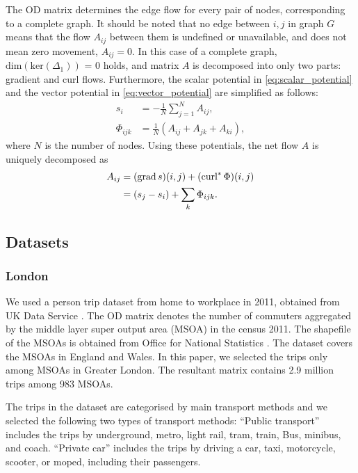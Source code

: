 \documentclass[]{article}
\begin{document}
The OD matrix determines the edge flow for every pair of nodes, corresponding to a complete graph.
It should be noted that no edge between ${i,j}$ in graph $G$ means that the flow $A_{ij}$ between them is undefined or unavailable, and does not mean zero movement, $A_{ij} = 0$.
In this case of a complete graph,
$\text{dim}(\text{ker} (\Delta_1) )$ = 0 holds, and matrix $A$ is decomposed into only two parts: gradient and curl flows.
Furthermore, the scalar potential in \eqref{eq:scalar_potential} and the vector potential in \eqref{eq:vector_potential} are simplified as follows:
\begin{align}
  s_i &= -\frac{1}{N}\sum_{j=1}^N A_{ij},\\
  \Phi_{ijk} & = \frac{1}{N}(A_{ij} + A_{jk} + A_{ki}),
\end{align}
where $N$ is the number of nodes. Using these potentials,
the net flow $A$ is uniquely decomposed as
\begin{align}
  A_{ij} & = (\text{grad}\, s)(i, j)  +  (\text{curl}^*\, \Phi)(i, j) \notag \\
         &= (s_j - s_i) + \sum_k \Phi_{ijk}.
\end{align}


%
%
%
%
%
%
%
%
%
%
%
%
%
%
%
\subsection*{Datasets}
\subsubsection*{London} 
We used a person trip dataset from home to workplace in 2011,
obtained from UK Data Service \cite{TripDataLondon}.
The OD matrix denotes the number of commuters aggregated by the middle layer super output area (MSOA) in the census 2011.
The shapefile of the MSOAs is obtained from Office for National Statistics \cite{ShapeDataLondon}.
The dataset covers the MSOAs in England and Wales.
In this paper, we selected the trips only among MSOAs in Greater London.
The resultant matrix contains 2.9 million trips among 983 MSOAs.

The trips in the dataset are categorised by main transport methods
and we selected the following two types of transport methods:
``Public transport''  includes the trips by underground, metro, light rail, tram, train, Bus, minibus, and coach.
``Private car'' includes the trips by driving a car, taxi, motorcycle, scooter, or moped, including their passengers.
\end{document}
